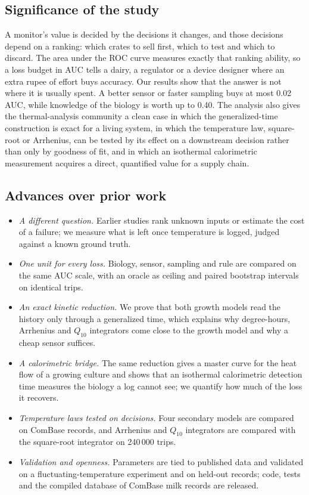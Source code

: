 \subsection{Significance of the study}\label{sec:important}
A monitor's value is decided by the decisions it changes, and those decisions depend on a ranking: which crates to sell first, which to test and which to discard. The area under the ROC curve measures exactly that ranking ability, so a loss budget in AUC tells a dairy, a regulator or a device designer where an extra rupee of effort buys accuracy. Our results show that the answer is not where it is usually spent. A better sensor or faster sampling buys at most 0.02 AUC, while knowledge of the biology is worth up to 0.40. The analysis also gives the thermal-analysis community a clean case in which the generalized-time construction is exact for a living system, in which the temperature law, square-root or Arrhenius, can be tested by its effect on a downstream decision rather than only by goodness of fit, and in which an isothermal calorimetric measurement acquires a direct, quantified value for a supply chain.

\subsection{Advances over prior work}\label{sec:beyond}
\begin{itemize}
\item \textit{A different question.} Earlier studies rank unknown inputs or estimate the cost of a failure; we measure what is left once temperature is logged, judged against a known ground truth.
\item \textit{One unit for every loss.} Biology, sensor, sampling and rule are compared on the same AUC scale, with an oracle as ceiling and paired bootstrap intervals on identical trips.
\item \textit{An exact kinetic reduction.} We prove that both growth models read the history only through a generalized time, which explains why degree-hours, Arrhenius and $Q_{10}$ integrators come close to the growth model and why a cheap sensor suffices.
\item \textit{A calorimetric bridge.} The same reduction gives a master curve for the heat flow of a growing culture and shows that an isothermal calorimetric detection time measures the biology a log cannot see; we quantify how much of the loss it recovers.
\item \textit{Temperature laws tested on decisions.} Four secondary models are compared on ComBase records, and Arrhenius and $Q_{10}$ integrators are compared with the square-root integrator on 240\,000 trips.
\item \textit{Validation and openness.} Parameters are tied to published data and validated on a fluctuating-temperature experiment and on held-out records; code, tests and the compiled database of \DatNFull{} ComBase milk records are released.
\end{itemize}

